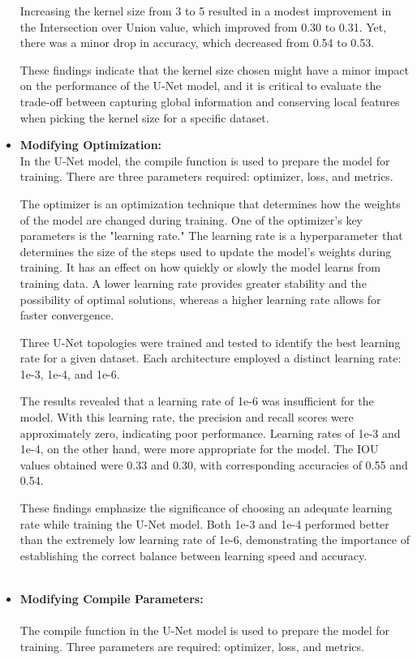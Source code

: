 \begin{itemize}
        Increasing the kernel size from 3 to 5 resulted in a modest improvement in the Intersection over Union value, which improved from 0.30 to 0.31. Yet, there was a minor drop in accuracy, which decreased from 0.54 to 0.53.
        
        These findings indicate that the kernel size chosen might have a minor impact on the performance of the U-Net model, and it is critical to evaluate the trade-off between capturing global information and conserving local features when picking the kernel size for a specific dataset.
        \\
    \item \textbf{Modifying Optimization:}\\
        
        In the U-Net model, the compile function is used to prepare the model for training. There are three parameters required: optimizer, loss, and metrics.

        The optimizer is an optimization technique that determines how the weights of the model are changed during training. One of the optimizer's key parameters is the "learning rate." The learning rate is a hyperparameter that determines the size of the steps used to update the model's weights during training. It has an effect on how quickly or slowly the model learns from training data. A lower learning rate provides greater stability and the possibility of optimal solutions, whereas a higher learning rate allows for faster convergence.
        
        Three U-Net topologies were trained and tested to identify the best learning rate for a given dataset. Each architecture employed a distinct learning rate: 1e-3, 1e-4, and 1e-6.
        
        The results revealed that a learning rate of 1e-6 was insufficient for the model. With this learning rate, the precision and recall scores were approximately zero, indicating poor performance. Learning rates of 1e-3 and 1e-4, on the other hand, were more appropriate for the model. The IOU values obtained were 0.33 and 0.30, with corresponding accuracies of 0.55 and 0.54.
        
        These findings emphasize the significance of choosing an adequate learning rate while training the U-Net model. Both 1e-3 and 1e-4 performed better than the extremely low learning rate of 1e-6, demonstrating the importance of establishing the correct balance between learning speed and accuracy.
        \\
        \\
    \item \textbf{Modifying Compile Parameters:}\\
        \\
        The compile function in the U-Net model is used to prepare the model for training. Three parameters are required: optimizer, loss, and metrics.


\end{itemize}
